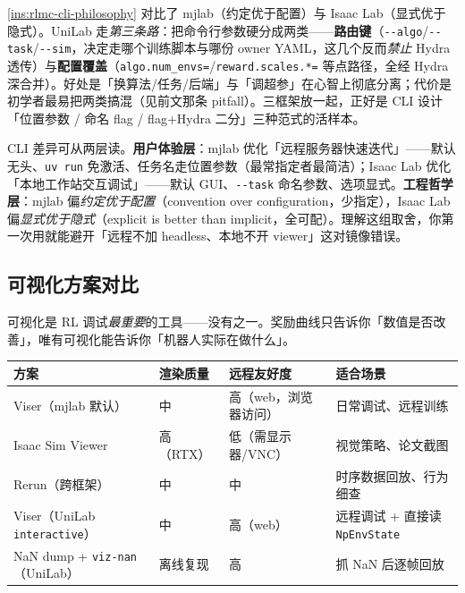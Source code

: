 \begin{note}
\cref{ins:rlmc-cli-philosophy} 对比了 mjlab（约定优于配置）与 Isaac Lab（显式优于隐式）。UniLab 走\emph{第三条路}：把命令行参数硬分成两类——\textbf{路由键}（\verb|--algo|/\verb|--task|/\verb|--sim|，决定走哪个训练脚本与哪份 owner YAML，这几个反而\emph{禁止} Hydra 透传）与\textbf{配置覆盖}（\verb|algo.num_envs=|/\verb|reward.scales.*=| 等点路径，全经 Hydra 深合并）。好处是「换算法/任务/后端」与「调超参」在心智上彻底分离；代价是初学者最易把两类搞混（见前文那条 pitfall）。三框架放一起，正好是 CLI 设计「位置参数 / 命名 flag / flag+Hydra 二分」三种范式的活样本。
\end{note}

\begin{insight}\label{ins:rlmc-cli-philosophy}
CLI 差异可从两层读。\textbf{用户体验层}：mjlab 优化「远程服务器快速迭代」——默认无头、\verb|uv run| 免激活、任务名走位置参数（最常指定者最简洁）；Isaac Lab 优化「本地工作站交互调试」——默认 GUI、\verb|--task| 命名参数、选项显式。\textbf{工程哲学层}：mjlab 偏\emph{约定优于配置}（convention over configuration，少指定），Isaac Lab 偏\emph{显式优于隐式}（explicit is better than implicit，全可配）。理解这组取舍，你第一次用就能避开「远程不加 headless、本地不开 viewer」这对镜像错误。
\end{insight}

\subsection{可视化方案对比}

可视化是 RL 调试\emph{最重要}的工具——没有之一。奖励曲线只告诉你「数值是否改善」，唯有可视化能告诉你「机器人实际在做什么」。

\begin{center}
\small
\begin{tabular}{@{}llll@{}}
\toprule
方案 & 渲染质量 & 远程友好度 & 适合场景 \\
\midrule
Viser（mjlab 默认） & 中 & 高（web，浏览器访问） & 日常调试、远程训练 \\
Isaac Sim Viewer & 高（RTX） & 低（需显示器/VNC） & 视觉策略、论文截图 \\
Rerun（跨框架） & 中 & 中 & 时序数据回放、行为细查 \\
Viser（UniLab \verb|interactive|） & 中 & 高（web） & 远程调试 + 直接读 \verb|NpEnvState| \\
NaN dump + \verb|viz-nan|（UniLab） & 离线复现 & 高 & 抓 NaN 后逐帧回放 \\
\bottomrule
\end{tabular}
\end{center}


